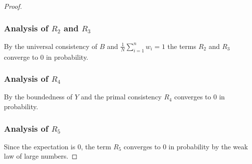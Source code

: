\begin{proof}
  \subsubsection*{Analysis of $R_2$ and $R_3$}
By the universal consistency of $B$ and 
$
  \frac{1}{N}
    \sum_{i=1}^{n} 
    w_i
    =1
$
the terms
$R_2$ and $R_3$ converge to $0$ in probability.
\subsubsection*{Analysis of $R_4$}
By the boundedness of $Y$ and the primal consistency 
$R_4$ 
converges to $0$ in probability.
\subsubsection*{Analysis of $R_5$}
Since the expectation is $0$, the term $R_5$ 
converges to $0$ in probability by the weak law of large numbers.

\end{proof}

